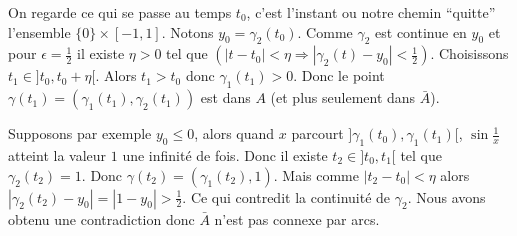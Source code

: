 {\begin{enumerate}
{On regarde ce qui se passe au temps $t_0$, c'est l'instant ou notre chemin ``quitte'' l'ensemble $\{0\}\times [-1,1]$. Notons $y_0 = \gamma_2(t_0)$.
Comme $\gamma_2$ est continue en $y_0$ et pour $\epsilon = \frac 12$ il existe $\eta>0$ tel que $(|t-t_0|<\eta \Rightarrow |\gamma_2(t)-y_0|<\frac12)$.
Choisissons $t_1\in ]t_0,t_0+\eta[$. Alors $t_1>t_0$ donc
$\gamma_1(t_1) > 0$. Donc le point $\gamma(t_1)=(\gamma_1(t_1),\gamma_2(t_1))$ est dans $A$ (et plus seulement dans $\bar A$).

Supposons par exemple $y_0 \le 0$, alors 
quand $x$ parcourt $]\gamma_1(t_0),\gamma_1(t_1)[$, $\sin \frac 1x$ atteint
la valeur $1$ une infinité de fois. Donc il existe $t_2 \in ]t_0,t_1[$ tel que
$\gamma_2(t_2)=1$. Donc $\gamma(t_2) = (\gamma_1(t_2),1)$.
Mais comme $|t_2-t_0|< \eta$ alors $|\gamma_2(t_2)-y_0|=|1-y_0| > \frac 12$.
Ce qui contredit la continuité de $\gamma_2$. Nous avons obtenu une contradiction donc $\bar A$ n'est pas connexe par arcs.}
\end{enumerate}
}
